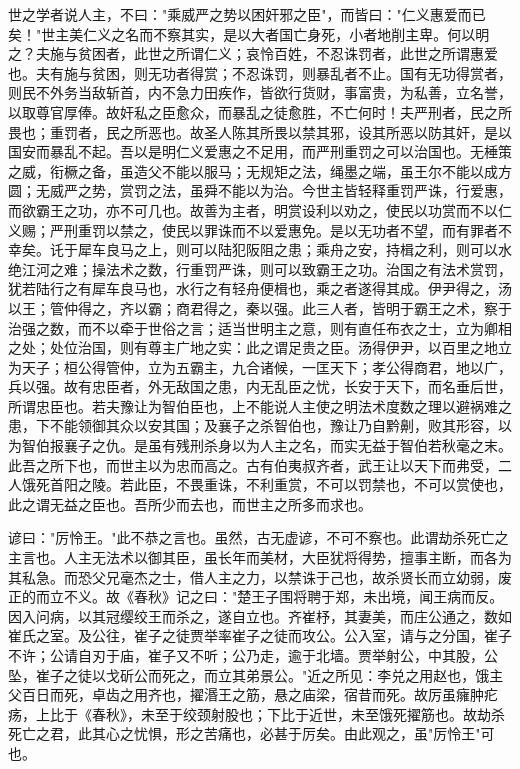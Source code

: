 \documentclass[]{article}
\begin{document}
世之学者说人主，不曰："乘威严之势以困奸邪之臣"，而皆曰："仁义惠爱而已矣！"世主美仁义之名而不察其实，是以大者国亡身死，小者地削主卑。何以明之？夫施与贫困者，此世之所谓仁义；哀怜百姓，不忍诛罚者，此世之所谓惠爱也。夫有施与贫困，则无功者得赏；不忍诛罚，则暴乱者不止。国有无功得赏者，则民不外务当敌斩首，内不急力田疾作，皆欲行货财，事富贵，为私善，立名誉，以取尊官厚俸。故奸私之臣愈众，而暴乱之徒愈胜，不亡何时！夫严刑者，民之所畏也；重罚者，民之所恶也。故圣人陈其所畏以禁其邪，设其所恶以防其奸，是以国安而暴乱不起。吾以是明仁义爱惠之不足用，而严刑重罚之可以治国也。无棰策之威，衔橛之备，虽造父不能以服马；无规矩之法，绳墨之端，虽王尔不能以成方圆；无威严之势，赏罚之法，虽舜不能以为治。今世主皆轻释重罚严诛，行爱惠，而欲霸王之功，亦不可几也。故善为主者，明赏设利以劝之，使民以功赏而不以仁义赐；严刑重罚以禁之，使民以罪诛而不以爱惠免。是以无功者不望，而有罪者不幸矣。讬于犀车良马之上，则可以陆犯阪阻之患；乘舟之安，持楫之利，则可以水绝江河之难；操法术之数，行重罚严诛，则可以致霸王之功。治国之有法术赏罚，犹若陆行之有犀车良马也，水行之有轻舟便楫也，乘之者遂得其成。伊尹得之，汤以王；管仲得之，齐以霸；商君得之，秦以强。此三人者，皆明于霸王之术，察于治强之数，而不以牵于世俗之言；适当世明主之意，则有直任布衣之士，立为卿相之处；处位治国，则有尊主广地之实：此之谓足贵之臣。汤得伊尹，以百里之地立为天子；桓公得管仲，立为五霸主，九合诸候，一匡天下；孝公得商君，地以广，兵以强。故有忠臣者，外无敌国之患，内无乱臣之忧，长安于天下，而名垂后世，所谓忠臣也。若夫豫让为智伯臣也，上不能说人主使之明法术度数之理以避祸难之患，下不能领御其众以安其国；及襄子之杀智伯也，豫让乃自黔劓，败其形容，以为智伯报襄子之仇。是虽有残刑杀身以为人主之名，而实无益于智伯若秋毫之末。此吾之所下也，而世主以为忠而高之。古有伯夷叔齐者，武王让以天下而弗受，二人饿死首阳之陵。若此臣，不畏重诛，不利重赏，不可以罚禁也，不可以赏使也，此之谓无益之臣也。吾所少而去也，而世主之所多而求也。

谚曰："厉怜王。"此不恭之言也。虽然，古无虚谚，不可不察也。此谓劫杀死亡之主言也。人主无法术以御其臣，虽长年而美材，大臣犹将得势，擅事主断，而各为其私急。而恐父兄毫杰之士，借人主之力，以禁诛于己也，故杀贤长而立幼弱，废正的而立不义。故《春秋》记之曰："楚王子围将聘于郑，未出境，闻王病而反。因入问病，以其冠缨绞王而杀之，遂自立也。齐崔杼，其妻美，而庄公通之，数如崔氏之室。及公往，崔子之徒贾举率崔子之徒而攻公。公入室，请与之分国，崔子不许；公请自刃于庙，崔子又不听；公乃走，逾于北墙。贾举射公，中其股，公坠，崔子之徒以戈斫公而死之，而立其弟景公。"近之所见：李兑之用赵也，饿主父百日而死，卓齿之用齐也，擢湣王之筋，悬之庙梁，宿昔而死。故厉虽癕肿疕疡，上比于《春秋》，未至于绞颈射股也；下比于近世，未至饿死擢筋也。故劫杀死亡之君，此其心之忧惧，形之苦痛也，必甚于厉矣。由此观之，虽"厉怜王"可也。
\end{document}
